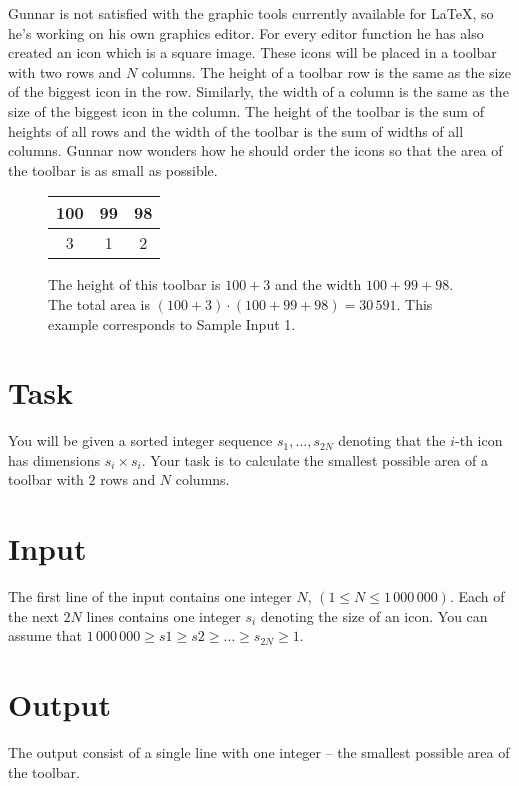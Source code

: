 Gunnar is not satisfied with the graphic tools currently available for \LaTeX, so he's working on his own graphics
editor. For every editor function he has also created an icon which is a square image. These icons will be placed
in a toolbar with two rows and $N$ columns. The height of a toolbar row is the same as the size of the biggest icon
in the row. Similarly, the width of a column is the same as the size of the biggest icon in the column. The height
of the toolbar is the sum of heights of all rows and the width of the toolbar is the sum of widths of all columns.
Gunnar now wonders how he should order the icons so that the area of the toolbar is as small as possible.

\begin{figure}
    \begin{tabular}{|c|c|c|}
        \hline
        100 & 99 & 98 \\ \hline
        3 & 1 & 2 \\ \hline
    \end{tabular}
    \caption{The height of this toolbar is $100 + 3$ and the width $100 + 99 + 98$. The total area is $(100 + 3) \cdot (100 + 99 + 98) = 30\,591$.
    This example corresponds to Sample Input 1.}
\end{figure}

\section*{Task}
You will be given a sorted integer sequence $s_1, \dots, s_{2N}$ denoting that the $i$-th icon has dimensions $s_i \times s_i$.
Your task is to calculate the smallest possible area of a toolbar with $2$ rows and $N$ columns.

\section*{Input}
The first line of the input contains one integer $N$, $(1 \le N \le 1\,000\,000)$.
Each of the next $2N$ lines contains one integer $s_i$ denoting the size of an icon.
You can assume that $1\,000\,000 \ge s1 \ge s2 \ge \dots \ge s_{2N} \ge 1$.

\section*{Output}
The output consist of a single line with one integer -- the smallest possible area of the toolbar.
